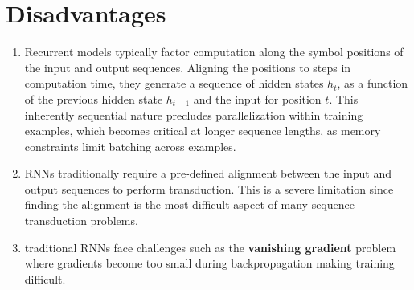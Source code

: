 \section{Disadvantages}

\begin{enumerate}
    \item Recurrent models typically factor computation along the symbol positions of the input and output sequences. 
    Aligning the positions to steps in computation time, they generate a sequence of hidden states $h_t$, as a function of the previous hidden state $h_{t-1}$ and the input for position $t$. 
    This inherently sequential nature precludes parallelization within training examples, which becomes critical at longer sequence lengths, as memory constraints limit batching across examples.
    \hfill \cite{arxiv/1706.03762/Attention-Is-All-You-Need}

    \item  RNNs traditionally require a pre-defined alignment between the input and output sequences to perform transduction. 
    This is a severe limitation since finding the alignment is the most difficult aspect of many sequence transduction problems. 
    \hfill \cite{arxiv/1211.3711/Sequence-Transduction-RNN}

    \item traditional RNNs face challenges such as the \textbf{vanishing gradient} problem where gradients become too small during backpropagation making training difficult.
    \hfill \cite{geeksforgeeks/deep-learning/bidirectional-recurrent-neural-network}
\end{enumerate}

















